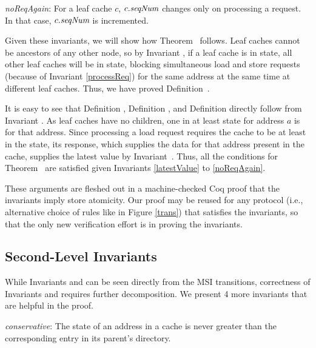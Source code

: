 \begin{inv}
\textit{noReqAgain}: For a leaf cache $c$, $c.\textit{seqNum}$ changes only on processing a request. In
that case, $c.\textit{seqNum}$ is incremented.
\label{noReqAgain}
\end{inv}

Given these invariants, we will show how Theorem~
follows.
Leaf caches cannot be ancestors of any other node, so by Invariant
, if a leaf cache is in \Mo{} state, all other
leaf caches will be in \In{} state, blocking simultaneous
load and store requests (because of Invariant \ref{processReq}) for the same
address at the same time at different leaf caches. Thus, we have proved
Definition~.

It is easy to see that Definition , Definition
, and Definition  directly follow
from Invariant .  As leaf caches have no children, one in
at least \Sh{} state for address $a$ is \clean{} for that address. Since
processing a load request requires the cache to be at least in the \Sh{} state,
its response, which supplies the data for that address present in the cache,
supplies the latest value by Invariant~. Thus, all the
conditions for Theorem~ are satisfied given Invariants
\ref{latestValue} to \ref{noReqAgain}.

These arguments are fleshed out in a machine-checked Coq proof that the invariants
imply store atomicity.  Our proof may be reused for any protocol (i.e., alternative
choice of rules like in Figure \ref{trans}) that satisfies the invariants,
so that the only new verification effort is in proving the invariants.


\subsection{Second-Level Invariants}
\label{secondLevel}

While Invariants  and  can be seen
directly from the MSI transitions, correctness of Invariants
 and  requires further
decomposition. We present 4 more invariants that are helpful in the proof.

\begin{inv}
\textit{conservative}: The state of an address in a cache is never greater than
the corresponding entry in its parent's directory.
\label{conservative}
\end{inv}

